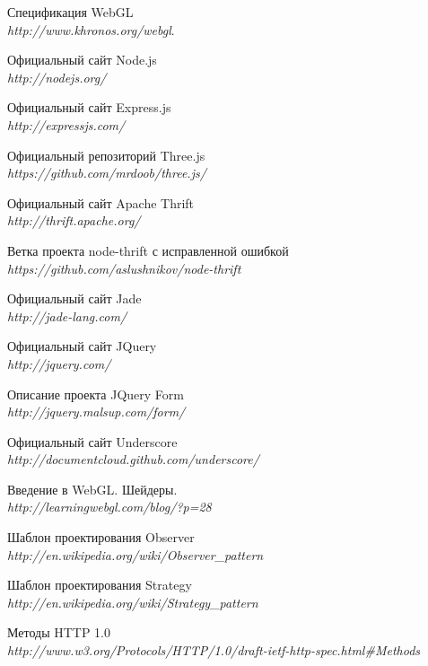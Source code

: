 \documentclass[14pt, a4paper]{extarticle}
\begin{document}
\begin{thebibliography}{9}

  Спецификация WebGL \\
  \emph{http://www.khronos.org/webgl}.

  Официальный сайт Node.js \\
  \emph{http://nodejs.org/}

  Официальный сайт Express.js \\
  \emph{http://expressjs.com/}

  Официальный репозиторий Three.js \\
  \emph{https://github.com/mrdoob/three.js/}

  Официальный сайт Apache Thrift \\
  \emph{http://thrift.apache.org/}

  Ветка проекта node-thrift с исправленной ошибкой \\
  \emph{https://github.com/aslushnikov/node-thrift}

  Официальный сайт Jade \\
  \emph{http://jade-lang.com/}

  Официальный сайт JQuery \\
  \emph{http://jquery.com/}

  Описание проекта JQuery Form \\
  \emph{http://jquery.malsup.com/form/}

  Официальный сайт Underscore \\
  \emph{http://documentcloud.github.com/underscore/}

  Введение в WebGL. Шейдеры. \\
  \emph{http://learningwebgl.com/blog/?p=28}

  Шаблон проектирования Observer \\
  \emph{http://en.wikipedia.org/wiki/Observer\_pattern}

  Шаблон проектирования Strategy \\
  \emph{http://en.wikipedia.org/wiki/Strategy\_pattern}

  Методы HTTP 1.0 \\
  \emph{http://www.w3.org/Protocols/HTTP/1.0/draft-ietf-http-spec.html\#Methods }

\end{thebibliography}
\end{document}
